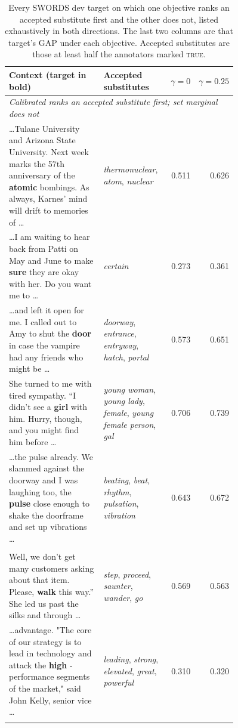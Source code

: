 \begin{table}[t]
\centering\small
\begin{tabular}{p{0.46\linewidth} p{0.30\linewidth} rr}
\toprule
Context (target in \textbf{bold}) & Accepted substitutes & $\gamma{=}0$ & $\gamma{=}0.25$ \\
\midrule
\multicolumn{4}{l}{\textit{Calibrated ranks an accepted substitute first; set marginal does not}} \\
\addlinespace[2pt]
\dots Tulane University and Arizona State University. Next week marks the 57th anniversary of the \textbf{atomic} bombings. As always, Karnes' mind will drift to memories of \dots & \textit{thermonuclear}, \textit{atom}, \textit{nuclear} & 0.511 & 0.626 \\
\addlinespace[2pt]
\dots I am waiting to hear back from Patti on May and June to make \textbf{sure} they are okay with her. Do you want me to \dots & \textit{certain} & 0.273 & 0.361 \\
\addlinespace[2pt]
\dots and left it open for me. I called out to Amy to shut the \textbf{door} in case the vampire had any friends who might be \dots & \textit{doorway}, \textit{entrance}, \textit{entryway}, \textit{hatch}, \textit{portal} & 0.573 & 0.651 \\
\addlinespace[2pt]
She turned to me with tired sympathy. “I didn’t see a \textbf{girl} with him. Hurry, though, and you might find him before \dots & \textit{young woman}, \textit{young lady}, \textit{female}, \textit{young female person}, \textit{gal} & 0.706 & 0.739 \\
\addlinespace[2pt]
\dots the pulse already. We slammed against the doorway and I was laughing too, the \textbf{pulse} close enough to shake the doorframe and set up vibrations \dots & \textit{beating}, \textit{beat}, \textit{rhythm}, \textit{pulsation}, \textit{vibration} & 0.643 & 0.672 \\
\addlinespace[2pt]
\midrule
\multicolumn{4}{l}{\textit{Set marginal ranks an accepted substitute first; calibrated does not}} \\
\addlinespace[2pt]
Well, we don’t get many customers asking about that item. Please, \textbf{walk} this way.” She led us past the silks and through \dots & \textit{step}, \textit{proceed}, \textit{saunter}, \textit{wander}, \textit{go} & 0.569 & 0.563 \\
\addlinespace[2pt]
\dots advantage. "The core of our strategy is to lead in technology and attack the \textbf{high} -performance segments of the market," said John Kelly, senior vice \dots & \textit{leading}, \textit{strong}, \textit{elevated}, \textit{great}, \textit{powerful} & 0.310 & 0.320 \\
\addlinespace[2pt]
\bottomrule
\end{tabular}
\caption{Every SWORDS dev target on which one objective ranks an accepted substitute
first and the other does not, listed exhaustively in both directions. The last two
columns are that target's GAP under each
objective. Accepted substitutes are those at least half the annotators marked \textsc{true}.}
\label{tab:qual}
\end{table}

